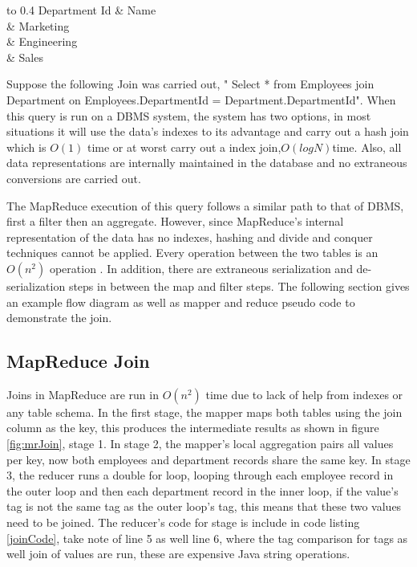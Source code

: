 \documentclass[10pt,twocolumn]{IEEEtran11}
\begin{document}
\begin{table}[h!]
	\centering
	\begin{tabu} to 0.4\textwidth { | X[l] | X[c] |}
		\hline
		 Department Id & Name\\ 
		  & Marketing   \\
		  & Engineering    \\
		& Sales  \\
		\hline
	\end{tabu}
	\caption{Hadoop vs DBMS-x performance}
	\label{table:hadoopVsDBMS}
\end{table}

Suppose the following Join was carried out, " Select * from Employees join Department on Employees.DepartmentId = Department.DepartmentId".
When this query is run on a DBMS system, the system has two options, in most situations it will use the data's indexes to its advantage and carry out a hash join which is $O(1)$ time or at worst carry out a index join,$ O(log N) $time.  Also, all data representations are internally maintained in the database and no extraneous conversions are carried out.
\par
The MapReduce execution of this query follows a similar path to that of DBMS, first a filter then an aggregate.  However, since MapReduce's internal representation of the data has no indexes, hashing and divide and conquer techniques cannot be applied.  Every operation between the two tables is an $O(n^2)$ operation \cite{afrati2010optimizing}.  In addition, there are extraneous serialization and de-serialization steps in between the map and filter steps.  The following section gives an example flow diagram as well as mapper and reduce pseudo code to demonstrate the join.

\subsection{MapReduce Join}

Joins in MapReduce are run in $O(n^2)$ time due to lack of help from indexes or any table schema.  In the first stage, the mapper maps both tables using the join column as the key, this produces the intermediate results as shown in figure \ref{fig:mrJoin}, stage 1.  In stage 2, the mapper's local aggregation pairs all values per key, now both employees and department records share the same key. In stage 3, the reducer  runs a double for loop, looping through each employee record in the outer loop and then each department record in the inner loop, if the value's tag is not the same tag as the outer loop's tag, this means that these two values need to be joined.  The reducer's code for stage is include in code listing \ref{joinCode}, take note of line 5 as well line 6, where the tag comparison for tags as well join of values are run, these are expensive Java string operations. 
\end{document}
